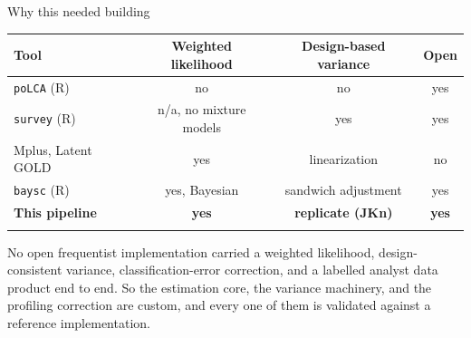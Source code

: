 \documentclass[
  ignorenonframetext,
  aspectratio=169,
]{beamer}
\newcommand{\kicker}[1]{\par\noindent{\footnotesize\color{vteal}\textbf{\MakeUppercase{#1}}}\par\vspace{0.4em}}
\begin{document}
\begin{frame}{Why this needed building}
\label{why-this-needed-building}
\kicker{the tooling gap}

\footnotesize

\begin{longtable}[]{@{}lccc@{}}
\toprule\noalign{}
Tool & Weighted likelihood & Design-based variance & Open \\
\midrule\noalign{}
\endhead
\texttt{poLCA} (R) & no & no & yes \\
\texttt{survey} (R) & n/a, no mixture models & yes & yes \\
Mplus, Latent GOLD & yes & linearization & no \\
\texttt{baysc} (R) & yes, Bayesian & sandwich adjustment & yes \\
\textbf{This pipeline} & \textbf{yes} & \textbf{replicate (JKn)} &
\textbf{yes} \\
\bottomrule\noalign{}
\end{longtable}

\vspace{0.7em}

\small

No open frequentist implementation carried a weighted likelihood,
design-consistent variance, classification-error correction, and a
labelled analyst data product end to end. So the estimation core, the
variance machinery, and the profiling correction are custom, and every
one of them is validated against a reference implementation.

\end{frame}
\end{document}
